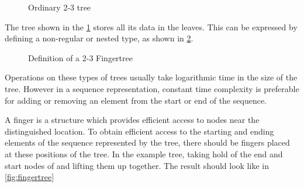 \begin{figure}[!h]
\centering
{}
\caption{Ordinary 2-3 tree
\label{fig:2-3tree}}
\end{figure}

The tree shown in the \cref{fig:2-3tree} stores all its data in the leaves.
This can be expressed by defining a non-regular or nested type, as shown in
\cref{fig:2-3Fingertree}.

\begin{figure}[h!]

\caption{Definition of a 2-3 Fingertree \label{fig:2-3Fingertree}}
\end{figure}

Operations on these types of trees usually take logarithmic time in the size of
the tree. However in a sequence representation, constant time complexity is
preferable for adding or removing an element from the start or end of the
sequence.

A finger is a structure which provides efficient access to nodes near the
distinguished location. To obtain efficient access to the starting and ending
elements of the sequence represented by the tree, there should be fingers placed
at these positions of the tree. In the example tree, taking hold of the end and start
nodes of and lifting them up together. The result should look like in
\cref{fig:fingertree}

